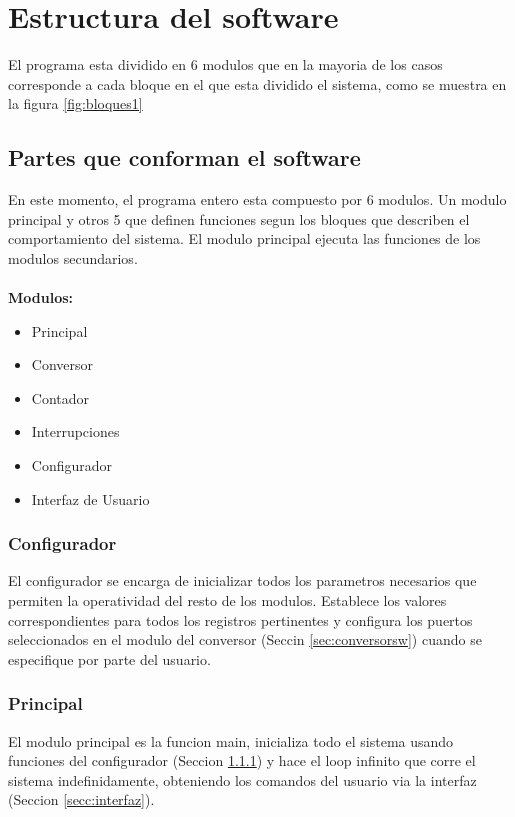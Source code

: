 
\section{Estructura del software}
El programa esta dividido en 6 modulos que en la mayoria de los casos corresponde a cada bloque en el que esta dividido el sistema, como se muestra en la figura \ref{fig:bloques1}

\subsection{Partes que conforman el software}
En este momento, el programa entero esta compuesto por 6 modulos. Un modulo principal y otros 5 que definen funciones segun los bloques que describen el comportamiento del sistema. El modulo principal ejecuta las funciones de los modulos secundarios.

\paragraph{}
\textbf{Modulos:}
\begin{itemize}
  \item Principal
  \item Conversor
  \item Contador
  \item Interrupciones
  \item Configurador
  \item Interfaz de Usuario
\end{itemize}

\subsubsection{Configurador}\label{sec:configuradorsw}
El configurador se encarga de inicializar todos los parametros necesarios que permiten la operatividad del resto de los modulos. Establece los valores correspondientes para todos los registros pertinentes y configura los puertos seleccionados en el modulo del conversor (Seccin \ref{sec:conversorsw}) cuando se especifique por parte del usuario.
\subsubsection{Principal}
El modulo principal es la funcion main, inicializa todo el sistema usando funciones del configurador (Seccion \ref{sec:configuradorsw}) y hace el loop infinito que corre el sistema indefinidamente, obteniendo los comandos del usuario via la interfaz (Seccion \ref{secc:interfaz}).

